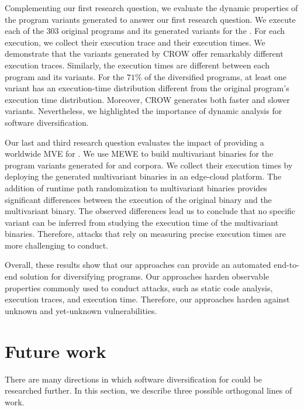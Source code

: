 Complementing our first research question, we evaluate the dynamic properties of the program variants generated to answer our first research question.
We execute each of the 303 original programs and its generated variants for the \corpusrosetta.
For each execution, we collect their execution trace and their execution times.
We demonstrate that the \wasm variants generated by CROW offer remarkably different execution traces.
Similarly, the execution times are different between each program and its variants.
For the $71\%$ of the diversified programs, at least one variant has an execution-time distribution different from the original program's execution time distribution.
Moreover, CROW generates both faster and slower variants.
Nevertheless, we highlighted the importance of dynamic analysis for software diversification. 

Our last and third research question evaluates the impact of providing a worldwide MVE for \wasm.
We use MEWE to build multivariant binaries for the program variants generated for \corpussodium and \corpusqrcode corpora.
We collect their execution times by deploying the generated multivariant binaries in an edge-cloud platform.
The addition of runtime path randomization to multivariant binaries provides significant differences between the execution of the original binary and the multivariant binary.
The observed differences lead us to conclude that no specific variant can be inferred from studying the execution time of the multivariant binaries. Therefore, attacks that rely on measuring precise execution times are more challenging to conduct.


Overall, these results show that our approaches can provide an automated end-to-end solution for diversifying \wasm programs. 
Our approaches harden observable properties commonly used to conduct attacks, such as static code analysis, execution traces, and execution time.
Therefore, our approaches harden \wasm against unknown and yet-unknown vulnerabilities.


\section{Future work}
\label{future_work}

There are many directions in which software diversification for \wasm could be researched further.
In this section, we describe three possible orthogonal lines of work.

\\
\\

